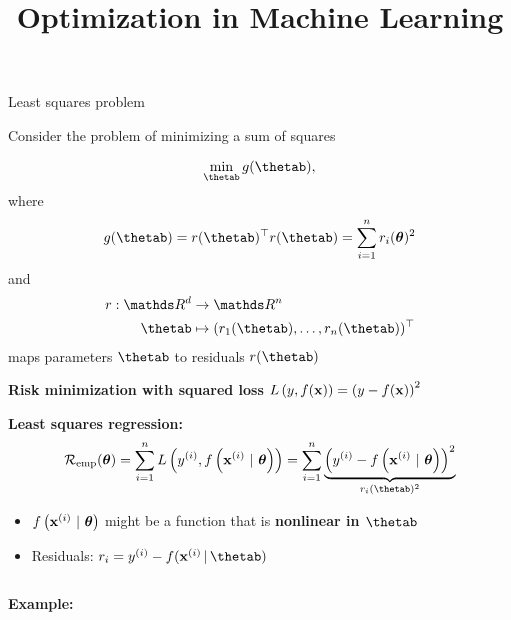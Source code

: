 \documentclass[11pt,compress,t,notes=noshow, xcolor=table]{beamer}
\title{Optimization in Machine Learning}
\begin{document}

\begin{vbframe}{Least squares problem}

Consider the problem of minimizing a sum of squares

\begin{equation*}
	\min_{\thetab} g(\thetab),
\end{equation*}
where
\begin{equation*}
    g(\thetab) = r(\thetab)^\top r(\thetab) = \sum_{i = 1}^n r_i(\bm{\theta})^2
\end{equation*}
and
\begin{align*}
	r: \R^d &\to \R^n \\
	\thetab &\mapsto (r_1(\thetab), \ldots, r_n(\thetab))^\top
\end{align*}
maps parameters $\thetab$ to residuals $r(\thetab)$

\framebreak 

\textbf{Risk minimization with squared loss} $L\left(y, f(\mathbf{x})\right) = \left(y - f(\mathbf{x})\right)^2$

\medskip

\textbf{Least squares regression:}
\begin{equation*}
    \risket = \sumin \Lxyit = \sumin \underbrace{\left(\yi - \fxit \right)^2}_{r_i(\thetab)^2}
\end{equation*}

\begin{itemize}
    \item $f\left(\mathbf{x}^{(i)} ~|~ \bm{\theta}\right)$ might be a function that is \textbf{nonlinear in $\thetab$}
    \item Residuals: $r_i = y^{(i)} - f(\xv^{(i)} \,|\, \thetab)$
\end{itemize}

\vspace*{0.3cm} 

\begin{columns}
\begin{column}{0.55\textwidth}
\textbf{Example:} 


\end{column}
\end{columns}
\end{vbframe}
\end{document}
